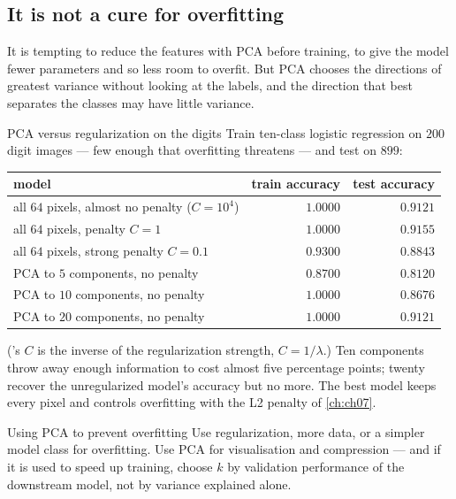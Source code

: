 \subsection{It is not a cure for overfitting}

It is tempting to reduce the features with PCA before training, to give the model
fewer parameters and so less room to overfit. But PCA chooses the directions of
greatest variance without looking at the labels, and the direction that best
separates the classes may have little variance.

\begin{workedexample}{PCA versus regularization on the digits}
Train ten-class logistic regression on $200$ digit images --- few enough that
overfitting threatens --- and test on $899$:

\begin{center}
\small
\renewcommand{\arraystretch}{1.12}
\begin{tabular}{@{}lrr@{}}
\toprule
model & train accuracy & test accuracy\\
\midrule
all $64$ pixels, almost no penalty ($C = 10^4$) & $1.0000$ & $0.9121$\\
all $64$ pixels, penalty $C = 1$                 & $1.0000$ & $\mathbf{0.9155}$\\
all $64$ pixels, strong penalty $C = 0.1$        & $0.9300$ & $0.8843$\\
PCA to $5$ components, no penalty                & $0.8700$ & $0.8120$\\
PCA to $10$ components, no penalty               & $1.0000$ & $0.8676$\\
PCA to $20$ components, no penalty               & $1.0000$ & $0.9121$\\
\bottomrule
\end{tabular}
\end{center}

('s $C$ is the inverse of the regularization strength,
$C = 1/\lambda$.) Ten components throw away enough information to cost almost
five percentage points; twenty recover the unregularized model's accuracy but no
more. The best model keeps every pixel and controls overfitting with the L2 penalty
of \cref{ch:ch07}.
\end{workedexample}

\begin{pitfall}{Using PCA to prevent overfitting}
Use regularization, more data, or a simpler model class for overfitting. Use PCA
for visualisation and compression --- and if it is used to speed up training,
choose $k$ by validation performance of the downstream model, not by variance
explained alone.
\end{pitfall}


